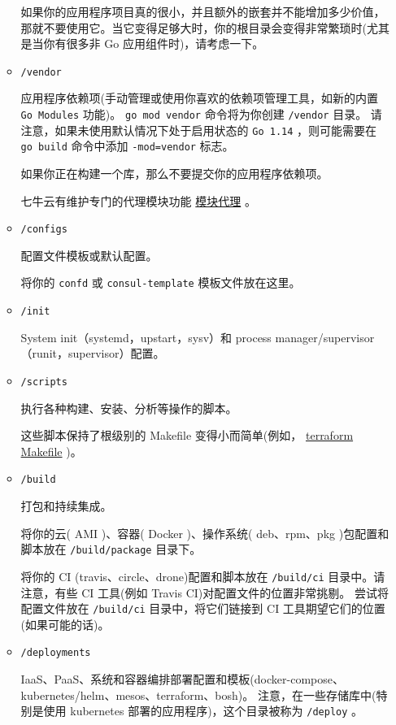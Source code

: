 \begin{itemize}[leftmargin=4em]
\begin{itemize}
    如果你的应用程序项目真的很小，并且额外的嵌套并不能增加多少价值，
    那就不要使用它。当它变得足够大时，你的根目录会变得非常繁琐时(尤其是当你有很多非 Go 应用组件时)，请考虑一下。

  \item \texttt{/vendor}

    应用程序依赖项(手动管理或使用你喜欢的依赖项管理工具，如新的内置 \texttt{Go Modules} 功能)。
    \texttt{go mod vendor} 命令将为你创建 \texttt{/vendor} 目录。
    请注意，如果未使用默认情况下处于启用状态的 \texttt{Go 1.14} ，则可能需要在 \texttt{go build} 命令中添加 \texttt{-mod=vendor} 标志。

    如果你正在构建一个库，那么不要提交你的应用程序依赖项。

    七牛云有维护专门的代理模块功能 \href{https://github.com/goproxy/goproxy.cn/blob/master/README.zh-CN.md}{模块代理} 。

  \item \texttt{/configs}

    配置文件模板或默认配置。

    将你的 \texttt{confd} 或 \texttt{consul-template} 模板文件放在这里。

  \item \texttt{/init}

    System init（systemd，upstart，sysv）和 process manager/supervisor（runit，supervisor）配置。

  \item \texttt{/scripts}

    执行各种构建、安装、分析等操作的脚本。

    这些脚本保持了根级别的 Makefile 变得小而简单(例如， \href{https://github.com/hashicorp/terraform/blob/master/Makefile}{terraform Makefile} )。

  \item \texttt{/build}

    打包和持续集成。

    将你的云( AMI )、容器( Docker )、操作系统( deb、rpm、pkg )包配置和脚本放在 \texttt{/build/package} 目录下。

    将你的 CI (travis、circle、drone)配置和脚本放在 \texttt{/build/ci} 目录中。请注意，有些 CI 工具(例如 Travis CI)对配置文件的位置非常挑剔。
    尝试将配置文件放在 \texttt{/build/ci} 目录中，将它们链接到 CI 工具期望它们的位置(如果可能的话)。

  \item \texttt{/deployments}

    IaaS、PaaS、系统和容器编排部署配置和模板(docker-compose、kubernetes/helm、mesos、terraform、bosh)。
    注意，在一些存储库中(特别是使用 kubernetes 部署的应用程序)，这个目录被称为 \texttt{/deploy} 。


\end{itemize}
\end{itemize}

